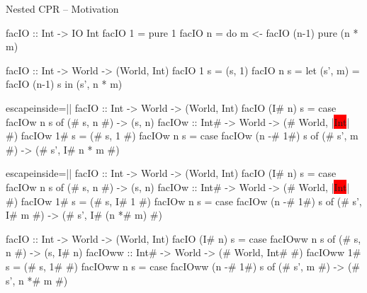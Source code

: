 \documentclass{haskellbeamer}
\begin{document}
\begin{frame}[fragile]{Nested CPR -- Motivation}
  \begin{center}
    \begin{minipage}{0.7\textwidth}
      \begin{overprint}
        \begin{haskell}
          facIO :: Int -> IO Int
          facIO 1 = pure 1
          facIO n = do
            m <- facIO (n-1)
            pure (n * m)
        \end{haskell}
        \begin{haskell}
          facIO :: Int -> World -> (World, Int)
          facIO 1 s = (s, 1)
          facIO n s =
            let (s', m) = facIO (n-1) s in
            (s', n * m)
        \end{haskell}
        \begin{haskell*}{escapeinside=||}
          facIO :: Int -> World -> (World, Int)
          facIO (I# n) s = case facIOw n s of
            (# s, n #) -> (s, n)
          facIOw  :: Int# -> World -> (# World, |\colorbox{red}{Int}| #)
          facIOw  1# s = (# s, 1 #)
          facIOw  n s = case facIOw (n -# 1#) s of
            (# s', m #) -> (# s', I# n * m #)
        \end{haskell*}
        \begin{haskell*}{escapeinside=||}
          facIO :: Int -> World -> (World, Int)
          facIO (I# n) s = case facIOw n s of
            (# s, n #) -> (s, n)
          facIOw  :: Int# -> World -> (# World, |\colorbox{red}{Int}| #)
          facIOw  1# s = (# s, I# 1 #)
          facIOw  n s = case facIOw (n -# 1#) s of
            (# s', I# m #) -> (# s', I# (n *# m) #)
        \end{haskell*}
        \begin{haskell}
          facIO :: Int -> World -> (World, Int)
          facIO (I# n) s = case facIOww n s of
            (# s, n #) -> (s, I# n)
          facIOww :: Int# -> World -> (# World, Int# #)
          facIOww 1# s = (# s, 1# #)
          facIOww n s = case facIOww (n -# 1#) s of
            (# s', m #) -> (# s', n *# m #)
        \end{haskell}
      \end{overprint}
    \end{minipage}
  \end{center}
\end{frame}
\end{document}
